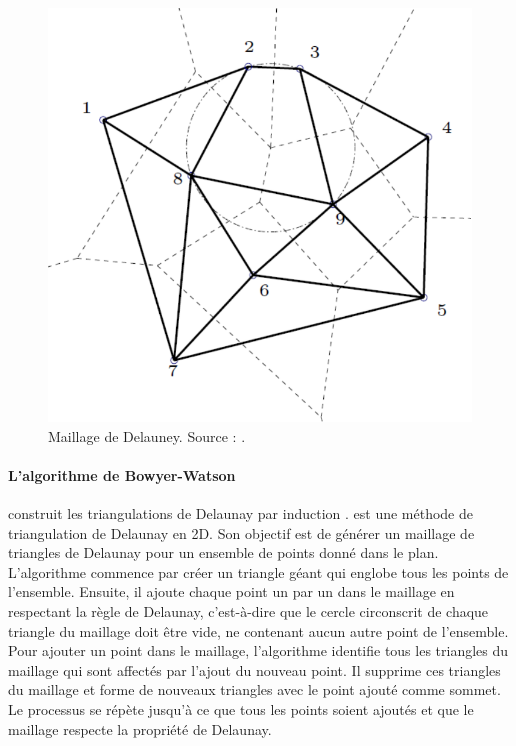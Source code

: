 \begin{figure}[!h]
    \centering
    \includegraphics[scale=0.65]{images/Maillage_delauney.pdf}
    \caption{Maillage de Delauney. Source : \cite{hecht2007maillage}.}
    \label{fig:maillage_delauney}
\end{figure}

\paragraph{L'algorithme de Bowyer-Watson} construit les triangulations de Delaunay par induction \cite{bowyer1981computing, watson1981computing, ern2004theory}.
 est une méthode de triangulation de Delaunay en 2D. Son objectif est de générer un maillage de triangles de Delaunay pour un ensemble de points donné dans le plan. L'algorithme commence par créer un triangle géant qui englobe tous les points de l'ensemble. Ensuite, il ajoute chaque point un par un dans le maillage en respectant la règle de Delaunay, c'est-à-dire que le cercle circonscrit de chaque triangle du maillage doit être vide, ne contenant aucun autre point de l'ensemble. Pour ajouter un point dans le maillage, l'algorithme identifie tous les triangles du maillage qui sont affectés par l'ajout du nouveau point. Il supprime ces triangles du maillage et forme de nouveaux triangles avec le point ajouté comme sommet. Le processus se répète jusqu'à ce que tous les points soient ajoutés et que le maillage respecte la propriété de Delaunay.

